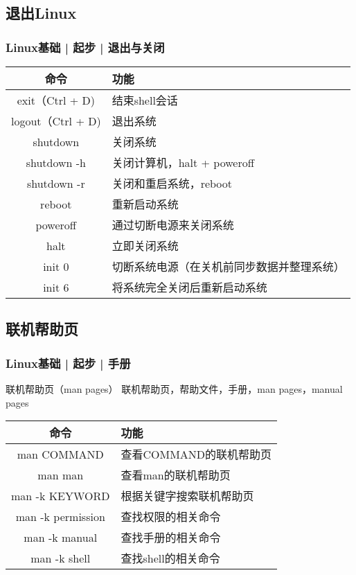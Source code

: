 \subsection{退出Linux}
\begin{frame}
  \frametitle{Linux基础 | 起步 | 退出与关闭}
  \begin{table}
    \centering
    \begin{tabular}{cl}
      \hline
      \rowcolor{blue!50}命令 & 功能\\
      \hline
      exit（Ctrl + D) & 结束shell会话\\
      logout（Ctrl + D) & 退出系统\\
      \hline
      shutdown & 关闭系统\\
      \alert{shutdown -h} & 关闭计算机，halt + poweroff\\
      shutdown -r & 关闭和重启系统，reboot\\
      \alert{reboot} & 重新启动系统\\
      poweroff & 通过切断电源来关闭系统\\
      halt & 立即关闭系统\\
      init 0 & 切断系统电源（在关机前同步数据并整理系统）\\
      init 6 & 将系统完全关闭后重新启动系统\\
      \hline
    \end{tabular}
  \end{table}
\end{frame}

\subsection{联机帮助页}
\begin{frame}
  \frametitle{Linux基础 | 起步 | 手册}
  \begin{block}{联机帮助页（man pages）}
    联机帮助页，帮助文件，手册，man pages，manual pages
  \end{block}
  \pause
  \begin{table}
    \centering
    \begin{tabular}{cl}
      \hline
      \rowcolor{blue!50}命令 & 功能\\
      \hline
      \alert{man COMMAND} & 查看COMMAND的联机帮助页\\
      man man & 查看man的联机帮助页\\
      \hline
      \alert{man -k KEYWORD} & 根据关键字搜索联机帮助页\\
      man -k permission & 查找权限的相关命令\\
      man -k manual & 查找手册的相关命令\\
      man -k shell & 查找shell的相关命令\\
      \hline
    \end{tabular}
  \end{table}
\end{frame}

